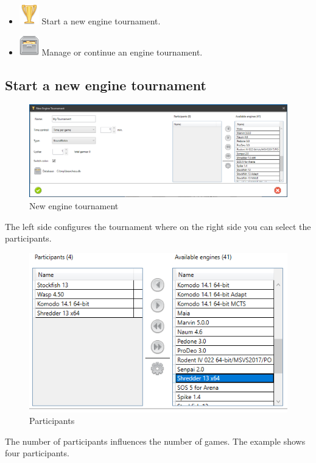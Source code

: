 \documentclass[11pt,a4paper]{article}
\begin{document}
\begin{itemize}
	\item \includegraphics[scale=0.5]{cup_gold.png} Start a new engine tournament.
	\item \includegraphics[scale=0.5]{file_manager.png} Manage or continue an engine tournament. 
\end{itemize}

\subsection{Start a new engine tournament}

\begin{figure}[H]
	\centering
	\includegraphics[scale=0.4]{EngineTournament1.png}
	\caption{New engine tournament}
	\label{fig:EngineTournament1}
\end{figure}

The left side configures the tournament where on the right side you can select the participants.

\begin{figure}[H]
	\centering
	\includegraphics[scale=0.8]{EngineTournament2.png}
	\caption{Participants}
	\label{fig:EngineTournament2}
\end{figure}
The number of participants influences the number of games. The example shows four participants.
\end{document}
